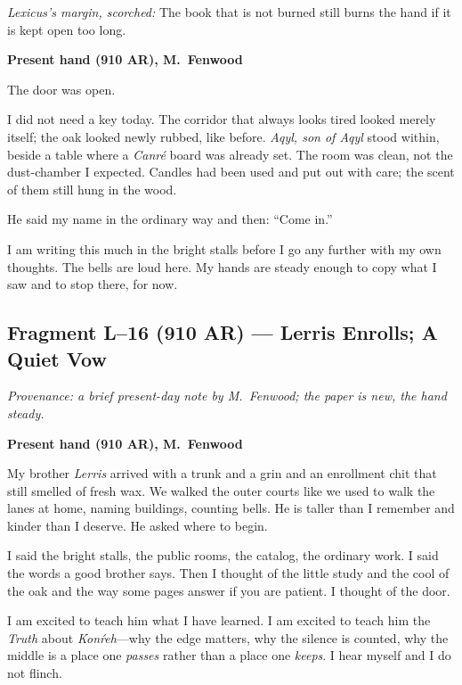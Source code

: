 \documentclass[11pt]{article}
\begin{document}
\medskip
\noindent\textit{Lexicus’s margin, scorched:} The book that is not burned still burns the hand if it is kept open too long.

\medskip
\noindent\textbf{Present hand (910 AR), M.\ Fenwood}

The door was open.

I did not need a key today. The corridor that always looks tired looked merely itself; the oak looked newly rubbed, like before. \textit{Aqyl, son of Aqyl} stood within, beside a table where a \textit{Canr\'e} board was already set. The room was clean, not the dust-chamber I expected. Candles had been used and put out with care; the scent of them still hung in the wood.

He said my name in the ordinary way and then: “Come in.”

I am writing this much in the bright stalls before I go any further with my own thoughts. The bells are loud here. My hands are steady enough to copy what I saw and to stop there, for now.

\subsection*{Fragment L--16 (910 AR) --- Lerris Enrolls; A Quiet Vow}
\label{frag:l16}
{}

\noindent\textit{Provenance: a brief present-day note by M.\ Fenwood; the paper is new, the hand steady.}

\medskip
\noindent\textbf{Present hand (910 AR), M.\ Fenwood}

My brother \textit{Lerris} arrived with a trunk and a grin and an enrollment chit that still smelled of fresh wax. We walked the outer courts like we used to walk the lanes at home, naming buildings, counting bells. He is taller than I remember and kinder than I deserve. He asked where to begin.

I said the bright stalls, the public rooms, the catalog, the ordinary work. I said the words a good brother says. Then I thought of the little study and the cool of the oak and the way some pages answer if you are patient. I thought of the door.

I am excited to teach him what I have learned. I am excited to teach him the \textit{Truth} about \textit{Kon\'reh}—why the edge matters, why the silence is counted, why the middle is a place one \emph{passes} rather than a place one \emph{keeps}. I hear myself and I do not flinch.
\end{document}

